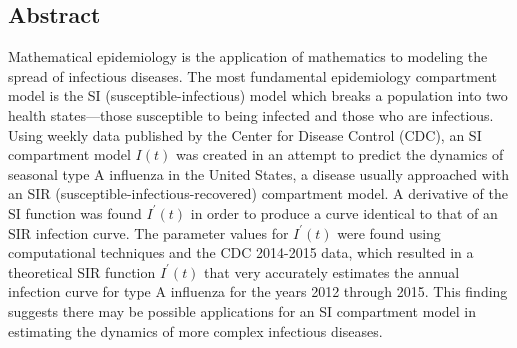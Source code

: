 \documentclass[a0, landscape, final]{a0poster}
\begin{document}

\begin{multicols}{4}


\color{DarkSlateGrey}

\section*{Abstract}

Mathematical epidemiology is the application of mathematics to modeling the spread of infectious diseases. The most fundamental epidemiology compartment model is the SI (susceptible-infectious) model which breaks a population into two health states---those susceptible to being infected and those who are infectious. Using weekly data published by the Center for Disease Control (CDC), an SI compartment model $I(t)$ was created in an attempt to predict the dynamics of seasonal type A influenza in the United States, a disease usually approached with an SIR (susceptible-infectious-recovered) compartment model. A derivative of the SI function was found $I^\prime(t)$ in order to produce a curve identical to that of an SIR infection curve. The parameter values for $I^\prime(t)$ were found using computational techniques and the CDC 2014-2015 data, which resulted in a theoretical SIR function $I^\prime(t)$ that very accurately estimates the annual infection curve for type A influenza for the years 2012 through 2015. This finding suggests there may be possible applications for an SI compartment model in estimating the dynamics of more complex infectious diseases.


\bigskip


\begin{definition*}[\textcolor{white}{Introduction}]
\color{Black}


\end{definition*}
\end{multicols}
\end{document}
